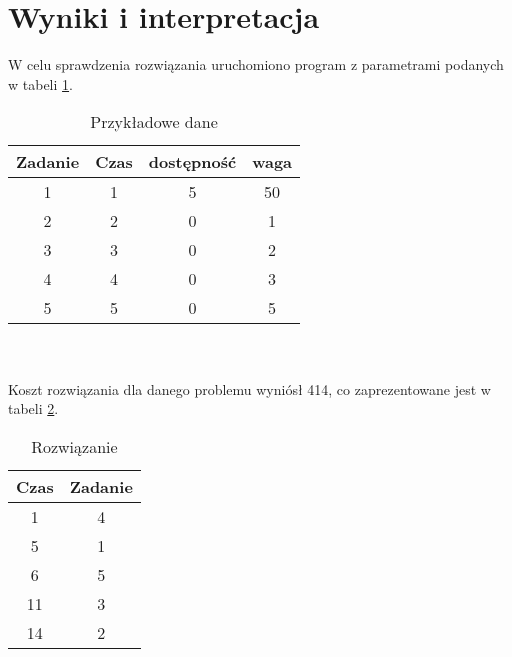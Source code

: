 \section{Wyniki i interpretacja}
W celu sprawdzenia rozwiązania uruchomiono program z parametrami podanych w tabeli \ref{tabela_zad2_dane}. 
\begin{table}[ht]
    \begin{center}
        \begin{tabular}{| c | c | c | c |} 
            \hline
            \rowcolor{lgray}
            Zadanie & Czas & dostępność & waga \\ [0.5ex] 
            \hline
            1 & 1 & 5 & 50\\
            \hline
            2 & 2 & 0 & 1 \\
            \hline
            3 & 3 & 0 & 2 \\
            \hline
            4 & 4 & 0 & 3 \\
            \hline
            5 & 5 & 0 & 5 \\
            \hline
        \end{tabular}
        \caption{Przykładowe dane}
        \label{tabela_zad2_dane}
    \end{center}
\end{table}
\   \\
\   \\
Koszt rozwiązania dla danego problemu wyniósł 414, co zaprezentowane jest w tabeli \ref{tabela_zad2_rozwiazanie}.


\begin{table}[ht]
    \begin{center}
        \begin{tabular}{| c | c |} 
            \hline
            \rowcolor{lgray}
            Czas & Zadanie \\ [0.5ex] 
            \hline
            \hline
            1 & 4 \\
            \hline
            5 & 1 \\
            \hline
            6  & 5 \\
            \hline
            11 & 3 \\
            \hline
            14 & 2 \\
            \hline
        \end{tabular}
        \caption{Rozwiązanie}
        \label{tabela_zad2_rozwiazanie}
    \end{center}
\end{table}


